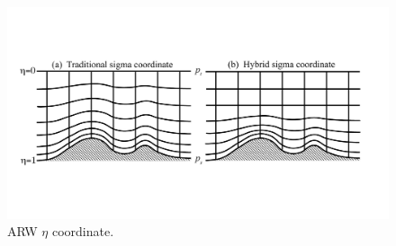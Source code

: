 %
%
\begin{figure}
\centerline{\includegraphics[width=38pc]{figures/vertical_coordinate_new.pdf}}
\caption{\label{figure:v_coord}ARW $\eta$ coordinate.}
\end{figure}

